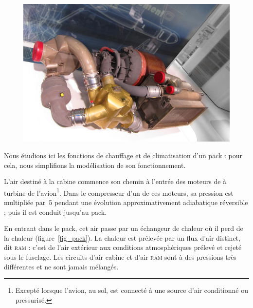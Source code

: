 	\begin{figure}
		\begin{center}
			\includegraphics[height=.35\textwidth]{images/liebherr_pack.jpg}
		\end{center}
		\label{fig_pack_c919}
	\end{figure}
	

	Nous étudions ici  les fonctions de chauffage et de climatisation d’un pack : pour cela, nous simplifions la modélisation de son fonctionnement.
	
		L’air destiné à la cabine commence son chemin à l’entrée des moteurs de à turbine de l’avion\footnote{Excepté lorsque l’avion, au sol, est connecté à une source d’air conditionné ou pressurisé.}. Dans le compresseur d’un de ces moteurs, sa pression est multipliée par~\num{5} pendant une évolution approximativement adiabatique réversible ; puis il est conduit jusqu’au pack.
	
		En entrant dans le pack, cet air passe par un échangeur de chaleur où il perd de la chaleur (figure~\ref{fig_pack}). La chaleur est prélevée par un flux d’air distinct, dit \textsc{ram} : c’est de l’air extérieur aux conditions atmosphériques prélevé et rejeté sous le fuselage. Les circuits d’air cabine et d’air \textsc{ram} sont à des pressions très différentes et ne sont jamais mélangés.
	
